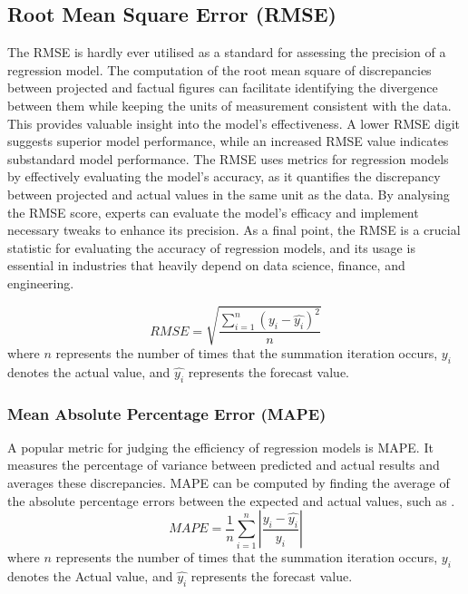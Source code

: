 \subsection{Root Mean Square Error (RMSE) }
The RMSE is hardly ever utilised as a standard for assessing the precision of a regression model. The computation of the root mean square of discrepancies between projected and factual figures can facilitate identifying the divergence between them while keeping the units of measurement consistent with the data. This provides valuable insight into the model's effectiveness. A lower RMSE digit suggests superior model performance,  while an increased RMSE value indicates substandard model performance. The RMSE  uses metrics for regression models by effectively evaluating the model's accuracy,  as it quantifies the discrepancy between projected and actual values in the same unit as the data. By analysing the RMSE score,  experts can evaluate the model's efficacy and implement necessary tweaks to enhance its precision. As a final point,  the RMSE is a crucial statistic for evaluating the accuracy of regression models,  and its usage is essential in industries that heavily depend on data science,  finance,  and engineering.

\begin{equation} \label{rmsee}
  RMSE=\sqrt{\frac{\sum_{i=1}^{n}(y_{i}-\hat{y_{i}})^2}{n}}
\end{equation}
where $n$ represents the number of times that the summation iteration occurs,  \begin{math} y_{i} \end{math} denotes the actual value,  and \begin{math}\hat{y_{i}}\end{math} represents the forecast value.

\subsubsection{ Mean Absolute Percentage Error (MAPE)}
  A popular metric for judging the efficiency of regression models is MAPE. It measures the percentage of variance between predicted and actual results and averages these discrepancies. MAPE can be computed by finding the average of the absolute percentage errors between the expected and actual values,  such as .
\begin{equation} \label{mapee}
  MAPE=\frac{1}{n}\sum_{i=1}^{n} \left | \frac{y_{i}-\hat{y_{i}}}{y_{i}} \right |
\end{equation}
where $n$ represents the number of times that the summation iteration occurs,  \begin{math} y_{i} \end{math} denotes the Actual value,  and \begin{math}\hat{y_{i}}\end{math} represents the forecast value.

